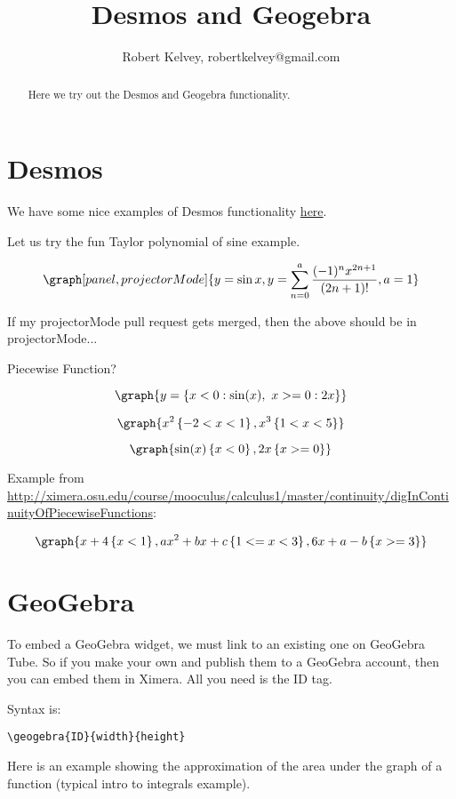 \documentclass{ximera}
\title{Desmos and Geogebra}
\author{Robert Kelvey, robertkelvey@gmail.com}
\begin{document}
\begin{abstract}
Here we try out the Desmos and Geogebra functionality.
\end{abstract}
\maketitle

\section{Desmos}

We have some nice examples of Desmos functionality  \href{http://ximera.osu.edu/course/jackschmidt/ximeraActivity/master/desmos}{here}. 

Let us try the fun Taylor polynomial of sine example.

\[
    \graph[panel, projectorMode]{y=\sin x, y=\sum _{n=0}^a\frac{(-1)^n x^{2n+1}}{(2n+1)!}, a=1}
\]

If my projectorMode pull request gets merged, then the above should be in projectorMode...


Piecewise Function?

\[
   \graph{ y=\left\{x<0:\sin (x),\ x>=0:2x\right\} }
\]

\[
    \graph{ x^2\left\{-2 < x < 1 \right\}, x^3 \left\{1<x<5\right\}}
\]

\[
    \graph{ \sin(x)\left\{x<0\right\}, 2x\left\{ x>=0 \right\} }
\]

Example from \href{Calculus1}{http://ximera.osu.edu/course/mooculus/calculus1/master/continuity/digInContinuityOfPiecewiseFunctions}:

\[
       \graph{ x+4\left\{x<1\right\}, ax^2+bx+c\left\{1<= x < 3\right\}, 6x+a-b\left\{x>=3\right\} }
\]


\section{GeoGebra}

To embed a GeoGebra widget, we must link to an existing one on GeoGebra Tube. So if you make your own and publish them to a GeoGebra account, then you can embed them in Ximera. All you need is the ID tag.

Syntax is: \begin{verbatim}\geogebra{ID}{width}{height} \end{verbatim}

Here is an example showing the approximation of the area under the graph of a function (typical intro to integrals example).

\end{document}

